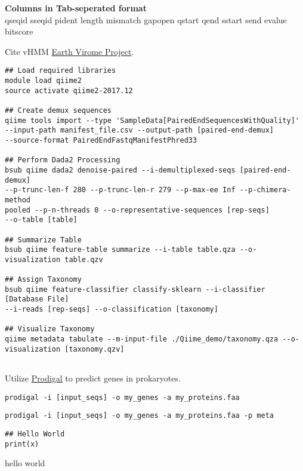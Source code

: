\documentclass[idxtotoc,hyperref,openany,oneside]{labbook} %
\begin{document}
\textbf{Columns in Tab-seperated format} \\
qseqid  sseqid  pident  length  mismatch  gapopen qstart  qend  sstart  send  evalue  bitscore


Cite vHMM \href{http://portal.nersc.gov/dna/microbial/prokpubs/EarthVirome_DP/}{Earth Virome Project}. 

\begin{verbatim}
## Load required libraries
module load qiime2
source activate qiime2-2017.12

## Create demux sequences
qiime tools import --type 'SampleData[PairedEndSequencesWithQuality]' 
--input-path manifest_file.csv --output-path [paired-end-demux] 
--source-format PairedEndFastqManifestPhred33

## Perform Dada2 Processing 
bsub qiime dada2 denoise-paired --i-demultiplexed-seqs [paired-end-demux]
--p-trunc-len-f 280 --p-trunc-len-r 279 --p-max-ee Inf --p-chimera-method 
pooled --p-n-threads 0 --o-representative-sequences [rep-seqs] 
--o-table [table]

## Summarize Table
bsub qiime feature-table summarize --i-table table.qza --o-visualization table.qzv

## Assign Taxonomy
bsub qiime feature-classifier classify-sklearn --i-classifier [Database File]
--i-reads [rep-seqs] --o-classification [taxonomy]

## Visualize Taxonomy
qiime metadata tabulate --m-input-file ./Qiime_demo/taxonomy.qza --o-visualization [taxonomy.qzv]


\end{verbatim}






Utilize \href{https://github.com/hyattpd/Prodigal}{Prodigal} to predict genes in prokaryotes.


\begin{verbatim}
prodigal -i [input_seqs] -o my_genes -a my_proteins.faa
\end{verbatim} 


\begin{verbatim}
prodigal -i [input_seqs] -o my_genes -a my_proteins.faa -p meta
\end{verbatim} 

\begin{lstlisting}
## Hello World 
print(x)
\end{lstlisting} 



hello world
\end{document}

